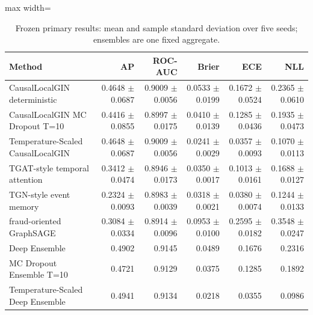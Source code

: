 \begin{table}[H]
\caption{Frozen primary results: mean and sample standard deviation over five seeds; ensembles are one fixed aggregate.}\label{tab:primary}
\centering\small
\begin{adjustbox}{max width=\linewidth}
\begin{tabular}{lrrrrr}
\toprule
Method & AP & ROC-AUC & Brier & ECE & NLL \\
\midrule
CausalLocalGIN deterministic & 0.4648 $\pm$ 0.0687 & 0.9009 $\pm$ 0.0056 & 0.0533 $\pm$ 0.0199 & 0.1672 $\pm$ 0.0524 & 0.2365 $\pm$ 0.0610 \\
CausalLocalGIN MC Dropout T=10 & 0.4416 $\pm$ 0.0855 & 0.8997 $\pm$ 0.0175 & 0.0410 $\pm$ 0.0139 & 0.1285 $\pm$ 0.0436 & 0.1935 $\pm$ 0.0473 \\
Temperature-Scaled CausalLocalGIN & 0.4648 $\pm$ 0.0687 & 0.9009 $\pm$ 0.0056 & 0.0241 $\pm$ 0.0029 & 0.0357 $\pm$ 0.0093 & 0.1070 $\pm$ 0.0113 \\
TGAT-style temporal attention & 0.3412 $\pm$ 0.0474 & 0.8946 $\pm$ 0.0173 & 0.0350 $\pm$ 0.0017 & 0.1013 $\pm$ 0.0161 & 0.1688 $\pm$ 0.0127 \\
TGN-style event memory & 0.2324 $\pm$ 0.0093 & 0.8983 $\pm$ 0.0039 & 0.0318 $\pm$ 0.0021 & 0.0380 $\pm$ 0.0074 & 0.1244 $\pm$ 0.0133 \\
fraud-oriented GraphSAGE & 0.3084 $\pm$ 0.0334 & 0.8914 $\pm$ 0.0096 & 0.0953 $\pm$ 0.0100 & 0.2595 $\pm$ 0.0182 & 0.3548 $\pm$ 0.0247 \\
Deep Ensemble & 0.4902 & 0.9145 & 0.0489 & 0.1676 & 0.2316 \\
MC Dropout Ensemble T=10 & 0.4721 & 0.9129 & 0.0375 & 0.1285 & 0.1892 \\
Temperature-Scaled Deep Ensemble & 0.4941 & 0.9134 & 0.0218 & 0.0355 & 0.0986 \\
\bottomrule
\end{tabular}
\end{adjustbox}
\end{table}
